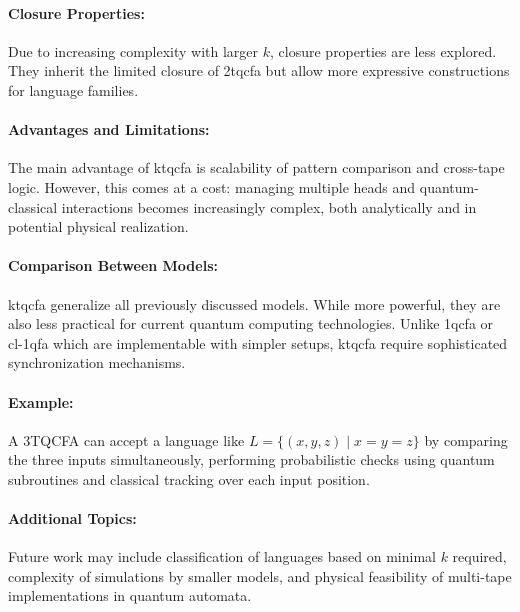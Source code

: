 \paragraph{Closure Properties:}  
Due to increasing complexity with larger $k$, closure properties are less explored. They inherit the limited closure of \gls{2tqcfa} but allow more expressive constructions for language families.

\paragraph{Advantages and Limitations:}  
The main advantage of \gls{ktqcfa} is scalability of pattern comparison and cross-tape logic. However, this comes at a cost: managing multiple heads and quantum-classical interactions becomes increasingly complex, both analytically and in potential physical realization.

\paragraph{Comparison Between Models:}  
\gls{ktqcfa} generalize all previously discussed models. While more powerful, they are also less practical for current quantum computing technologies. Unlike \gls{1qcfa} or \gls{cl-1qfa} which are implementable with simpler setups, \gls{ktqcfa} require sophisticated synchronization mechanisms.

\paragraph{Example:}  
A 3TQCFA can accept a language like $L = \{ (x, y, z) \mid x = y = z \}$ by comparing the three inputs simultaneously, performing probabilistic checks using quantum subroutines and classical tracking over each input position.

\paragraph{Additional Topics:}  
Future work may include classification of languages based on minimal $k$ required, complexity of simulations by smaller models, and physical feasibility of multi-tape implementations in quantum automata.